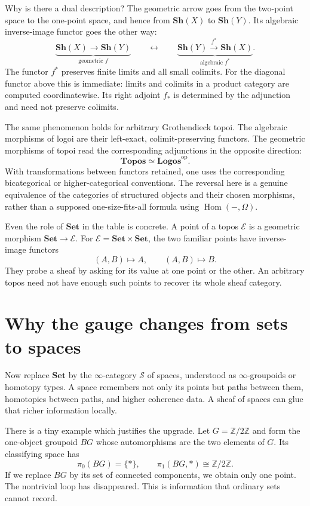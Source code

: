 Why is there a dual description? The geometric arrow goes from the two-point space to the one-point space, and hence from $\mathbf{Sh}(X)$ to $\mathbf{Sh}(Y)$. Its algebraic inverse-image functor goes the other way:
\[
 \underbrace{\mathbf{Sh}(X)\longrightarrow\mathbf{Sh}(Y)}
       _{\text{geometric }f}
 \qquad\longleftrightarrow\qquad
 \underbrace{\mathbf{Sh}(Y)\xrightarrow{\ f^*\ }\mathbf{Sh}(X)}
       _{\text{algebraic }f^*}.
\]
The functor $f^*$ preserves finite limits and all small colimits. For the diagonal functor above this is immediate: limits and colimits in a product category are computed coordinatewise. Its right adjoint $f_*$ is determined by the adjunction and need not preserve colimits.

The same phenomenon holds for arbitrary Grothendieck topoi. The algebraic morphisms of logoi are their left-exact, colimit-preserving functors. The geometric morphisms of topoi read the corresponding adjunctions in the opposite direction:
\[
 \boxed{\mathbf{Topos}\simeq\mathbf{Logos}^{\mathrm{op}}.}
\]
With transformations between functors retained, one uses the corresponding bicategorical or higher-categorical conventions. The reversal here is a genuine equivalence of the categories of structured objects and their chosen morphisms, rather than a supposed one-size-fits-all formula using $\operatorname{Hom}(-,\Omega)$.

Even the role of $\mathbf{Set}$ in the table is concrete. A point of a topos $\mathcal E$ is a geometric morphism $\mathbf{Set}\to\mathcal E$. For $\mathcal E=\mathbf{Set}\times\mathbf{Set}$, the two familiar points have inverse-image functors
\[
 (A,B)\longmapsto A,\qquad(A,B)\longmapsto B.
\]
They probe a sheaf by asking for its value at one point or the other. An arbitrary topos need not have enough such points to recover its whole sheaf category.

\section{Why the gauge changes from sets to spaces}

Now replace $\mathbf{Set}$ by the $\infty$-category $\mathcal S$ of spaces, understood as $\infty$-groupoids or homotopy types. A space remembers not only its points but paths between them, homotopies between paths, and higher coherence data. A sheaf of spaces can glue that richer information locally.

There is a tiny example which justifies the upgrade. Let $G=\mathbb Z/2\mathbb Z$ and form the one-object groupoid $BG$ whose automorphisms are the two elements of $G$. Its classifying space has
\[
 \boxed{\pi_0(BG)=\{*\},\qquad
        \pi_1(BG,*)\cong\mathbb Z/2\mathbb Z.}
\]
If we replace $BG$ by its set of connected components, we obtain only one point. The nontrivial loop has disappeared. This is information that ordinary sets cannot record.

